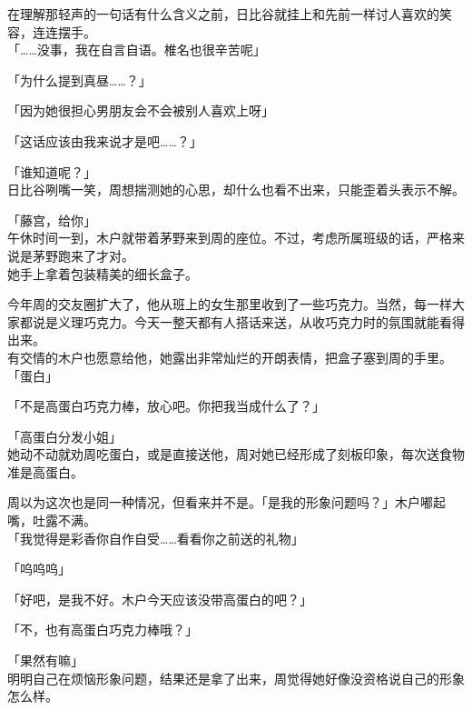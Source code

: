 在理解那轻声的一句话有什么含义之前，日比谷就挂上和先前一样讨人喜欢的笑容，连连摆手。\\

「……没事，我在自言自语。椎名也很辛苦呢」

「为什么提到真昼……？」

「因为她很担心男朋友会不会被别人喜欢上呀」

「这话应该由我来说才是吧……？」

「谁知道呢？」\\

日比谷咧嘴一笑，周想揣测她的心思，却什么也看不出来，只能歪着头表示不解。\\

\vspace{2\baselineskip}

「藤宫，给你」\\

午休时间一到，木户就带着茅野来到周的座位。不过，考虑所属班级的话，严格来说是茅野跑来了才对。\\

她手上拿着包装精美的细长盒子。

今年周的交友圈扩大了，他从班上的女生那里收到了一些巧克力。当然，每一样大家都说是义理巧克力。今天一整天都有人搭话来送，从收巧克力时的氛围就能看得出来。\\

有交情的木户也愿意给他，她露出非常灿烂的开朗表情，把盒子塞到周的手里。\\

「蛋白」

「不是高蛋白巧克力棒，放心吧。你把我当成什么了？」

「高蛋白分发小姐」\\

她动不动就劝周吃蛋白，或是直接送他，周对她已经形成了刻板印象，每次送食物准是高蛋白。

周以为这次也是同一种情况，但看来并不是。「是我的形象问题吗？」木户嘟起嘴，吐露不满。\\

「我觉得是彩香你自作自受……看看你之前送的礼物」

「呜呜呜」

「好吧，是我不好。木户今天应该没带高蛋白的吧？」

「不，也有高蛋白巧克力棒哦？」

「果然有嘛」\\

明明自己在烦恼形象问题，结果还是拿了出来，周觉得她好像没资格说自己的形象怎么样。

